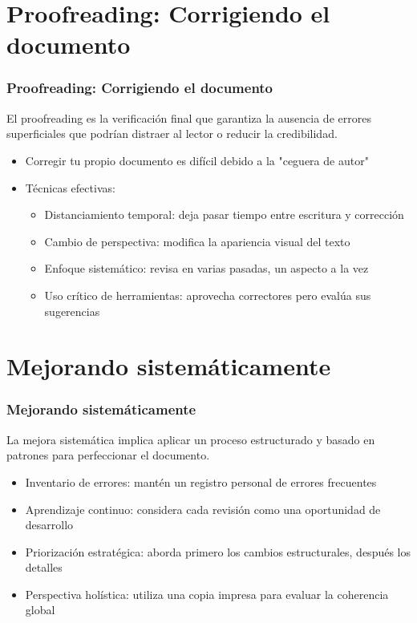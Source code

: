 \documentclass{beamer}
\begin{document}
\section{Proofreading: Corrigiendo el documento}
\begin{frame}
\frametitle{Proofreading: Corrigiendo el documento}

\textbf{} El proofreading es la verificación final que garantiza la ausencia de errores superficiales que podrían distraer al lector o reducir la credibilidad.

\vspace{0.3cm}
\begin{itemize}
\item Corregir tu propio documento es difícil debido a la "ceguera de autor"
\item Técnicas efectivas:
  \begin{itemize}
  \item Distanciamiento temporal: deja pasar tiempo entre escritura y corrección
  \item Cambio de perspectiva: modifica la apariencia visual del texto
  \item Enfoque sistemático: revisa en varias pasadas, un aspecto a la vez
  \item Uso crítico de herramientas: aprovecha correctores pero evalúa sus sugerencias
  \end{itemize}
\end{itemize}
\end{frame}
\section{Mejorando sistemáticamente}
\begin{frame}
\frametitle{Mejorando sistemáticamente}

\textbf{} La mejora sistemática implica aplicar un proceso estructurado y basado en patrones para perfeccionar el documento.

\vspace{0.3cm}
\begin{itemize}
\item Inventario de errores: mantén un registro personal de errores frecuentes
\item Aprendizaje continuo: considera cada revisión como una oportunidad de desarrollo
\item Priorización estratégica: aborda primero los cambios estructurales, después los detalles
\item Perspectiva holística: utiliza una copia impresa para evaluar la coherencia global
\end{itemize}
\end{frame}
\end{document}
